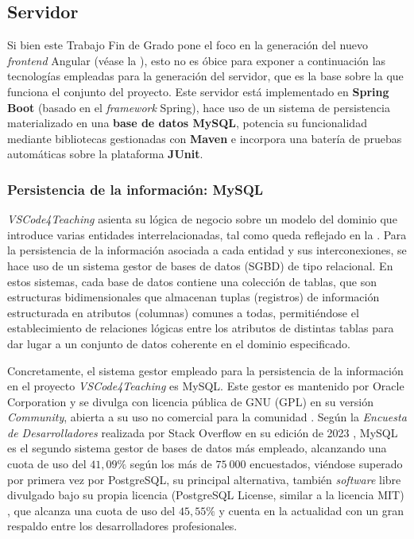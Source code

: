 \subsection{Servidor}
\label{subsec:tecServidor}
Si bien este Trabajo Fin de Grado pone el foco en la generación del nuevo \textit{frontend} Angular (véase la ), esto no es óbice para exponer a continuación las tecnologías empleadas para la generación del servidor, que es la base sobre la que funciona el conjunto del proyecto. Este servidor está implementado en \textbf{Spring Boot} (basado en el \textit{framework} Spring), hace uso de un sistema de persistencia materializado en una \textbf{base de datos MySQL}, potencia su funcionalidad mediante bibliotecas gestionadas con \textbf{Maven} e incorpora una batería de pruebas automáticas sobre la plataforma \textbf{JUnit}.

\subsubsection{Persistencia de la información: MySQL}
\label{subsec:tecMySQL}
\textit{VSCode4Teaching} asienta su lógica de negocio sobre un modelo del dominio que introduce varias entidades interrelacionadas, tal como queda reflejado en la . Para la persistencia de la información asociada a cada entidad y sus interconexiones, se hace uso de un sistema gestor de bases de datos (SGBD) de tipo relacional. En estos sistemas, cada base de datos contiene una colección de tablas, que son estructuras bidimensionales que almacenan tuplas (registros) de información estructurada en atributos (columnas) comunes a todas, permitiéndose el establecimiento de relaciones lógicas entre los atributos de distintas tablas para dar lugar a un conjunto de datos coherente en el dominio especificado.

Concretamente, el sistema gestor empleado para la persistencia de la información en el proyecto \textit{VSCode4Teaching} es MySQL. Este gestor es mantenido por Oracle Corporation y se divulga con licencia pública de GNU (GPL) en su versión \textit{Community}, abierta a su uso no comercial para la comunidad \cite{MySQL}. Según la \textit{Encuesta de Desarrolladores} realizada por Stack Overflow en su edición de 2023 \cite{subsec:tecAppAngularSurvey}, MySQL es el segundo sistema gestor de bases de datos más empleado, alcanzando una cuota de uso del $41,09\%$ según los más de $75\ 000$ encuestados, viéndose superado por primera vez por PostgreSQL, su principal alternativa, también \textit{software} libre divulgado bajo su propia licencia (PostgreSQL License, similar a la licencia MIT) \cite{PostgreSQL}, que alcanza una cuota de uso del $45,55\%$ y cuenta en la actualidad con un gran respaldo entre los desarrolladores profesionales.

